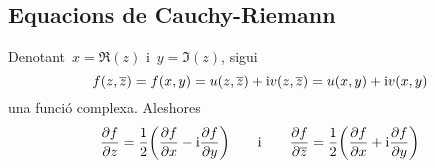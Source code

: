 \documentclass[../Apunts.tex]{subfiles}
\begin{document}
    \subsection{Equacions de Cauchy-Riemann}
    \begin{lemma}
        \label{lema:equacions de Cauchy-Riemann}
        Denotant~\(x=\Re(z)\) i~\(y=\Im(z)\), sigui
        \begin{equation*}
            \label{eq:1:lema:equaciosn de Cauchy-Riemann}
            f(z,\overline{z})
            =f(x,y)
            =u(z,\overline{z})+\mathrm{i} v(z,\overline{z})
            =u(x,y)+\mathrm{i} v(x,y)
        \end{equation*}
        una funció complexa.
        Aleshores
        \begin{equation*}
            \label{eq:3:lema:equacions de Cauchy-Riemann}
            \frac{\partial f}{\partial z}
            =\frac{1}{2}\biggl(\frac{\partial f}{\partial x}
            -\mathrm{i}\frac{\partial f}{\partial y}\biggr)
            \qquad\text{i}\qquad
            \frac{\partial f}{\partial\overline{z}}
            =\frac{1}{2}\biggl(\frac{\partial f}{\partial x}
            +\mathrm{i}\frac{\partial f}{\partial y}\biggr)
    \end{equation*}
    \end{lemma}
\end{document}
